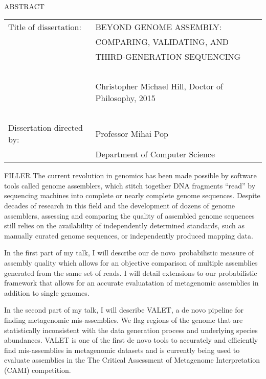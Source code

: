 
\hbox{\ }

\renewcommand{\baselinestretch}{1}
\small \normalsize

\begin{center}
\large{{ABSTRACT}} 

\vspace{3em} 

\end{center}
\hspace{-.15in}
\begin{tabular}{ll}
Title of dissertation:    & {\large  BEYOND GENOME ASSEMBLY: }\\
&				      {\large COMPARING, VALIDATING, AND } \\
&                     {\large THIRD-GENERATION SEQUENCING} \\
\ \\
&                          {\large  Christopher Michael Hill, Doctor of Philosophy, 2015} \\
\ \\
Dissertation directed by: & {\large  Professor Mihai Pop} \\
&  				{\large	 Department of Computer Science } \\
\end{tabular}

\vspace{3em}

\renewcommand{\baselinestretch}{2}
\large \normalsize

FILLER
The current revolution in genomics has been made possible by software tools called genome assemblers, which stitch together DNA fragments “read” by sequencing machines into complete or nearly complete genome sequences. Despite decades of research in this field and the development of dozens of genome assemblers, assessing and comparing the quality of assembled genome sequences still relies on the availability of independently determined standards, such as manually curated genome sequences, or independently produced mapping data.

In the first part of my talk, I will describe our de novo  probabilistic measure of assembly quality which allows for an objective comparison of multiple assemblies generated from the same set of reads. I will detail extensions to our probabilistic framework that allows for an accurate evaluatation of metagenomic assemblies in addition to single genomes.

In the second part of my talk, I will describe VALET, a de novo pipeline for finding metagenomic mis-assemblies.  We flag regions of the genome that are statistically inconsistent with the data generation process and underlying species abundances. VALET is one of the first de novo tools to accurately and efficiently find mis-assemblies in metagenomic datasets and is currently being used to evaluate assemblies in the The Critical Assessment of Metagenome Interpretation (CAMI) competition.

